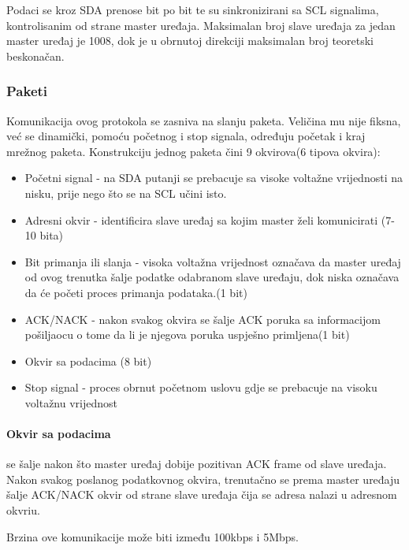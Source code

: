\documentclass[../Document.tex]{subfiles}
\begin{document}
\noindent Podaci se kroz SDA prenose bit po bit te su sinkronizirani sa SCL signalima, kontrolisanim od strane master uređaja. Maksimalan broj slave uređaja za jedan master uređaj je 1008, dok je u obrnutoj direkciji maksimalan broj teoretski beskonačan.

\subsubsection{Paketi}
Komunikacija ovog protokola se zasniva na slanju paketa. Veličina mu nije fiksna, već se dinamički, pomoću početnog i stop signala, određuju početak i kraj mrežnog paketa. Konstrukciju jednog paketa čini 9 okvirova(6 tipova okvira):

\begin{itemize}
    \item Početni signal - na SDA putanji se prebacuje sa visoke voltažne vrijednosti na nisku, prije nego što se na SCL učini isto.
    \item Adresni okvir - identificira slave uređaj sa kojim master želi komunicirati (7-10 bita)
    \item Bit primanja ili slanja - visoka voltažna vrijednost označava da master uređaj od ovog trenutka šalje podatke odabranom slave uređaju, dok niska označava da će početi proces primanja podataka.(1 bit)
    \item ACK/NACK - nakon svakog okvira se šalje ACK poruka sa informacijom pošiljaocu o tome da li je njegova poruka uspješno primljena(1 bit)
    \item Okvir sa podacima (8 bit)
    \item Stop signal - proces obrnut početnom uslovu gdje se prebacuje na visoku voltažnu vrijednost
\end{itemize}


\paragraph{Okvir sa podacima} se šalje nakon što master uređaj dobije pozitivan ACK frame od slave uređaja. Nakon svakog poslanog podatkovnog okvira, trenutačno se prema master uređaju šalje ACK/NACK okvir od strane slave uređaja čija se adresa nalazi u adresnom okvriu.\\


\noindent Brzina ove komunikacije može biti između 100kbps i 5Mbps.\\
\end{document}
